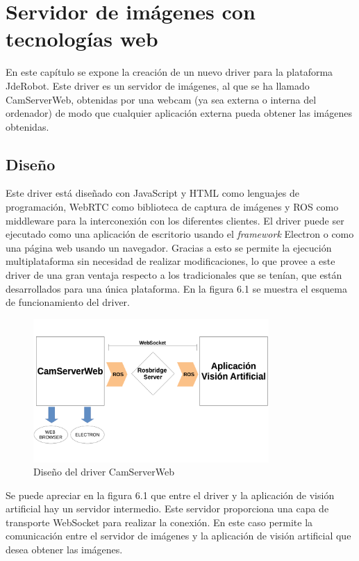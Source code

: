 \chapter{Servidor de imágenes con tecnologías web }\label{cap.camserver}
En este capítulo se expone la creación de un nuevo driver para la plataforma JdeRobot. Este driver es un servidor de imágenes, al que se ha llamado CamServerWeb, obtenidas por una webcam (ya sea externa o interna del ordenador) de modo que cualquier aplicación externa pueda obtener las imágenes obtenidas.
\section{Diseño}
Este driver está diseñado con JavaScript y HTML como lenguajes de programación, WebRTC como biblioteca de captura de imágenes y ROS como middleware para la interconexión con los diferentes clientes. El driver puede ser ejecutado como una aplicación de escritorio usando el \textit{framework} Electron o como una página web usando un navegador. Gracias a esto se permite la ejecución multiplataforma sin necesidad de realizar modificaciones, lo que provee a este driver de una gran ventaja respecto a los tradicionales que se tenían, que están desarrollados para una única plataforma.  En la figura 6.1 se muestra el esquema de funcionamiento del driver.
\begin{figure}[H]
  \begin{center}
    \includegraphics[width=0.8\textwidth]{figures/cajanegracamserver.png}
		\caption{Diseño del driver CamServerWeb}
		\label{fig.diseñocamserver}
		\end{center}
\end{figure}

Se puede apreciar en la figura 6.1 que entre el driver y la aplicación de visión artificial hay un servidor intermedio. Este servidor proporciona una capa de transporte WebSocket para realizar la conexión. En este caso permite la comunicación entre el servidor de imágenes y la aplicación de visión artificial que desea obtener las imágenes.

